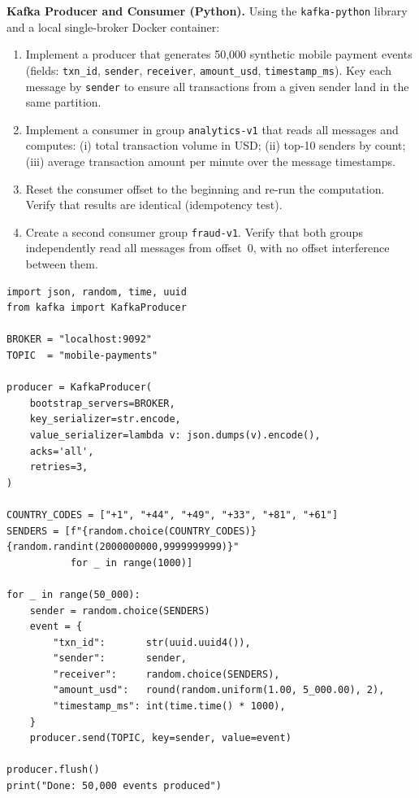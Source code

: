 
\pe \textbf{Kafka Producer and Consumer (Python).}
Using the \texttt{kafka-python} library and a local single-broker
Docker container:
\begin{enumerate}[label=(\alph*)]
  \item Implement a producer that generates 50{,}000 synthetic mobile
        payment events (fields: \texttt{txn\_id}, \texttt{sender},
        \texttt{receiver}, \texttt{amount\_usd}, \texttt{timestamp\_ms}).
        Key each message by \texttt{sender} to ensure all transactions
        from a given sender land in the same partition.
  \item Implement a consumer in group \texttt{analytics-v1} that reads
        all messages and computes: (i) total transaction volume in USD;
        (ii) top-10 senders by count; (iii) average transaction amount
        per minute over the message timestamps.
  \item Reset the consumer offset to the beginning and re-run the
        computation. Verify that results are identical (idempotency test).
  \item Create a second consumer group \texttt{fraud-v1}. Verify that
        both groups independently read all messages from offset~0,
        with no offset interference between them.
\end{enumerate}

\begin{lstlisting}[style=pyspark, caption={PE8.1: Kafka producer skeleton}]
import json, random, time, uuid
from kafka import KafkaProducer

BROKER = "localhost:9092"
TOPIC  = "mobile-payments"

producer = KafkaProducer(
    bootstrap_servers=BROKER,
    key_serializer=str.encode,
    value_serializer=lambda v: json.dumps(v).encode(),
    acks='all',
    retries=3,
)

COUNTRY_CODES = ["+1", "+44", "+49", "+33", "+81", "+61"]
SENDERS = [f"{random.choice(COUNTRY_CODES)}{random.randint(2000000000,9999999999)}"
           for _ in range(1000)]

for _ in range(50_000):
    sender = random.choice(SENDERS)
    event = {
        "txn_id":       str(uuid.uuid4()),
        "sender":       sender,
        "receiver":     random.choice(SENDERS),
        "amount_usd":   round(random.uniform(1.00, 5_000.00), 2),
        "timestamp_ms": int(time.time() * 1000),
    }
    producer.send(TOPIC, key=sender, value=event)

producer.flush()
print("Done: 50,000 events produced")
\end{lstlisting}


